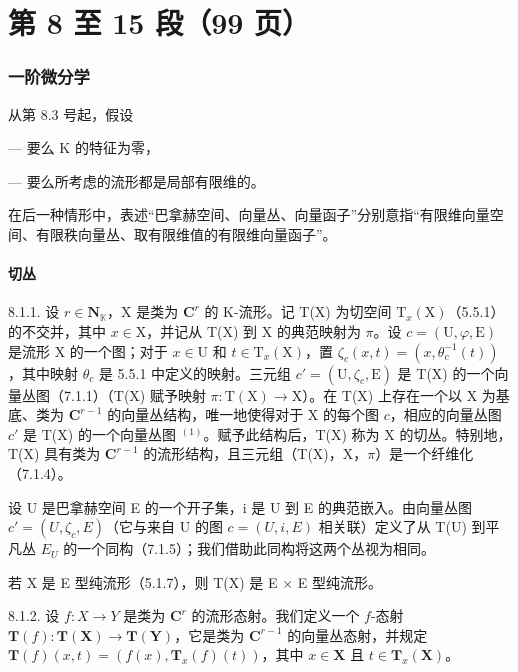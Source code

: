 \part{第 8 至 15 段（99 页）}

\setcounter{section}{7}

\section{一阶微分学}

从第 8.3 号起，假设

--- 要么 K 的特征为零，

--- 要么所考虑的流形都是局部有限维的。

在后一种情形中，表述“巴拿赫空间、向量丛、向量函子”分别意指“有限维向量空间、有限秩向量丛、取有限维值的有限维向量函子”。

\subsection{切丛}

8.1.1. 设 \(r \in \mathbf{N}_{\mathbb{K}}\)，X 是类为 \(\mathbf{C}^r\) 的 K-流形。记 T(X) 为切空间 \(\mathrm{T}_x(\mathrm{X})\)（5.5.1）的不交并，其中 \(x \in \mathrm{X}\)，并记从 T(X) 到 X 的典范映射为 \(\pi\)。设 \(c = (\mathrm{U}, \varphi, \mathrm{E})\) 是流形 X 的一个图；对于 \(x \in \mathrm{U}\) 和 \(t \in \mathrm{T}_x(\mathrm{X})\)，置 \(\zeta_c(x, t) = (x, \theta_c^{-1}(t))\)，其中映射 \(\theta_c\) 是 5.5.1 中定义的映射。三元组 \(c' = (\mathrm{U}, \zeta_c, \mathrm{E})\) 是 T(X) 的一个向量丛图（7.1.1）（T(X) 赋予映射 \(\pi: \mathrm{T}(\mathrm{X}) \to \mathrm{X}\)）。在 T(X) 上存在一个以 X 为基底、类为 \(\mathbf{C}^{r-1}\) 的向量丛结构，唯一地使得对于 X 的每个图 \(c\)，相应的向量丛图 \(c'\) 是 T(X) 的一个向量丛图 \(^{(1)}\)。赋予此结构后，T(X) 称为 X 的切丛。特别地，T(X) 具有类为 \(\mathbf{C}^{r-1}\) 的流形结构，且三元组（T(X)，X，\(\pi\)）是一个纤维化（7.1.4）。

设 U 是巴拿赫空间 E 的一个开子集，i 是 U 到 E 的典范嵌入。由向量丛图 \(c' = (U, \zeta_c, E)\)（它与来自 U 的图 \(c = (U, i, E)\) 相关联）定义了从 T(U) 到平凡丛 \(E_U\) 的一个同构（7.1.5）；我们借助此同构将这两个丛视为相同。

若 X 是 E 型纯流形（5.1.7），则 T(X) 是 E \(\times\) E 型纯流形。

8.1.2. 设 \(f: X \to Y\) 是类为 \(\mathbf{C}^r\) 的流形态射。我们定义一个 \(f\)-态射 \(\mathbf{T}(f): \mathbf{T}(\mathbf{X}) \to \mathbf{T}(\mathbf{Y})\)，它是类为 \(\mathbf{C}^{r-1}\) 的向量丛态射，并规定 \(\mathbf{T}(f)(x, t) = (f(x), \mathbf{T}_x(f)(t))\)，其中 \(x \in \mathbf{X}\) 且 \(t \in \mathbf{T}_x(\mathbf{X})\)。

